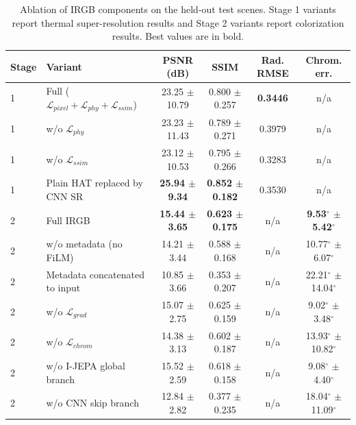 
\begin{table}[t]
\centering
\caption{Ablation of IRGB components on the held-out test scenes. Stage 1 variants report thermal super-resolution results and Stage 2 variants report colorization results. Best values are in bold.}
\label{tab:ablation}
\begin{tabular}{llcccc}
\hline
Stage & Variant & PSNR (dB) & SSIM & Rad. RMSE & Chrom. err. \\
\hline
1 & Full ($\mathcal{L}_{pixel} + \mathcal{L}_{phy} + \mathcal{L}_{ssim}$) & 23.25 $\pm$ 10.79 & 0.800 $\pm$ 0.257 & \textbf{0.3446} & n/a \\
1 & w/o $\mathcal{L}_{phy}$ & 23.23 $\pm$ 11.43 & 0.789 $\pm$ 0.271 & 0.3979 & n/a \\
1 & w/o $\mathcal{L}_{ssim}$ & 23.12 $\pm$ 10.53 & 0.795 $\pm$ 0.266 & 0.3283 & n/a \\
1 & Plain HAT replaced by CNN SR & \textbf{25.94 $\pm$ 9.34} & \textbf{0.852 $\pm$ 0.182} & 0.3530 & n/a \\
\hline
2 & Full IRGB & \textbf{15.44 $\pm$ 3.65} & \textbf{0.623 $\pm$ 0.175} & n/a & \textbf{9.53$^\circ$ $\pm$ 5.42$^\circ$} \\
2 & w/o metadata (no FiLM) & 14.21 $\pm$ 3.44 & 0.588 $\pm$ 0.168 & n/a & 10.77$^\circ$ $\pm$ 6.07$^\circ$ \\
2 & Metadata concatenated to input & 10.85 $\pm$ 3.66 & 0.353 $\pm$ 0.207 & n/a & 22.21$^\circ$ $\pm$ 14.04$^\circ$ \\
2 & w/o $\mathcal{L}_{grad}$ & 15.07 $\pm$ 2.75 & 0.625 $\pm$ 0.159 & n/a & 9.02$^\circ$ $\pm$ 3.48$^\circ$ \\
2 & w/o $\mathcal{L}_{chrom}$ & 14.38 $\pm$ 3.13 & 0.602 $\pm$ 0.187 & n/a & 13.93$^\circ$ $\pm$ 10.82$^\circ$ \\
2 & w/o I-JEPA global branch & 15.52 $\pm$ 2.59 & 0.618 $\pm$ 0.158 & n/a & 9.08$^\circ$ $\pm$ 4.40$^\circ$ \\
2 & w/o CNN skip branch & 12.84 $\pm$ 2.82 & 0.377 $\pm$ 0.235 & n/a & 18.04$^\circ$ $\pm$ 11.09$^\circ$ \\
\hline
\end{tabular}
\end{table}

